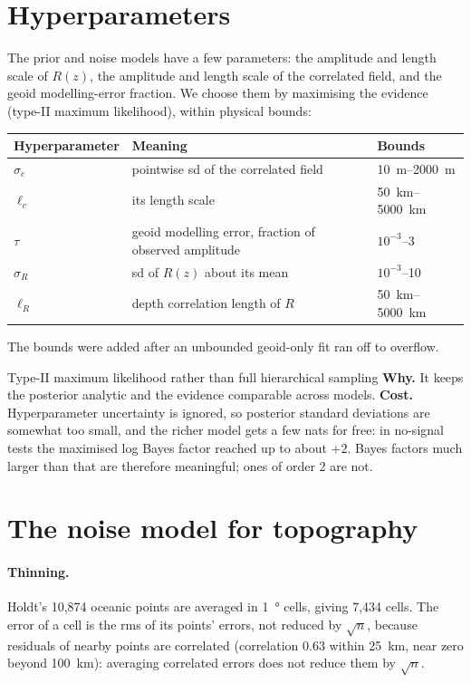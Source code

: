 \section{Hyperparameters}

The prior and noise models have a few parameters: the amplitude and length scale of $R(z)$, the amplitude and length scale of the correlated field, and the geoid modelling-error fraction.
We choose them by maximising the evidence (type-II maximum likelihood), within physical bounds:
\begin{center}
\begin{tabular}{lll}
\toprule
Hyperparameter & Meaning & Bounds\\
\midrule
$\sigma_c$ & pointwise sd of the correlated field & \qtyrange{10}{2000}{m}\\
$\ell_c$ & its length scale & \qtyrange{50}{5000}{km}\\
$\tau$ & geoid modelling error, fraction of observed amplitude & $10^{-3}$--3\\
$\sigma_R$ & sd of $R(z)$ about its mean & $10^{-3}$--10\\
$\ell_R$ & depth correlation length of $R$ & \qtyrange{50}{5000}{km}\\
\bottomrule
\end{tabular}
\end{center}
The bounds were added after an unbounded geoid-only fit ran off to overflow.

\begin{decision}{Type-II maximum likelihood rather than full hierarchical sampling}
\textbf{Why.} It keeps the posterior analytic and the evidence comparable across models.
\textbf{Cost.} Hyperparameter uncertainty is ignored, so posterior standard deviations are somewhat too small, and the richer model gets a few nats for free: in no-signal tests the maximised log Bayes factor reached up to about $+2$.
Bayes factors much larger than that are therefore meaningful; ones of order 2 are not.
\end{decision}

\section{The noise model for topography}

\paragraph{Thinning.}
Holdt's 10,874 oceanic points are averaged in \qty{1}{\degree} cells, giving 7,434 cells.
The error of a cell is the rms of its points' errors, not reduced by $\sqrt n$, because residuals of nearby points are correlated (correlation 0.63 within \qty{25}{km}, near zero beyond \qty{100}{km}): averaging correlated errors does not reduce them by $\sqrt n$.

